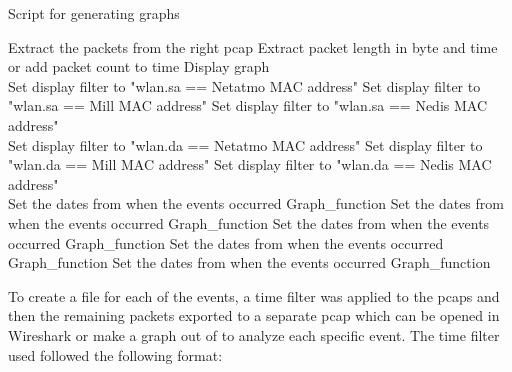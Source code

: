 \begin{algorithm}[H]
\caption{Script for generating graphs}\label{alg:GraphScript}
\begin{algorithmic}[1]
         
            \State Extract the packets from the right pcap
                \State Extract packet length in byte and time or add packet count to time
                \State Display graph
            \EndFor
        \EndFor {}\\
     
            \State Set display filter to "wlan.sa == Netatmo MAC address"
            \State Set display filter to "wlan.sa == Mill MAC address"
            \State Set display filter to "wlan.sa == Nedis MAC address"    
        \EndIf\\
     
            \State Set display filter to "wlan.da == Netatmo MAC address"
            \State Set display filter to "wlan.da == Mill MAC address"
            \State Set display filter to "wlan.da == Nedis MAC address"  
        \EndIf\\
     
        \State Set the dates from when the events occurred 
        \State Graph\_function
        \State Set the dates from when the events occurred 
        \State Graph\_function
        \State Set the dates from when the events occurred 
        \State Graph\_function
        \State Set the dates from when the events occurred 
        \State Graph\_function
        \State Set the dates from when the events occurred 
        \State Graph\_function
    \EndIf {}
\end{algorithmic}
\end{algorithm}

To create a file for each of the events, a time filter was applied to the pcaps and then the remaining packets exported to a separate pcap which can be opened in Wireshark or make a graph out of to analyze each specific event. The time filter used followed the following format:

